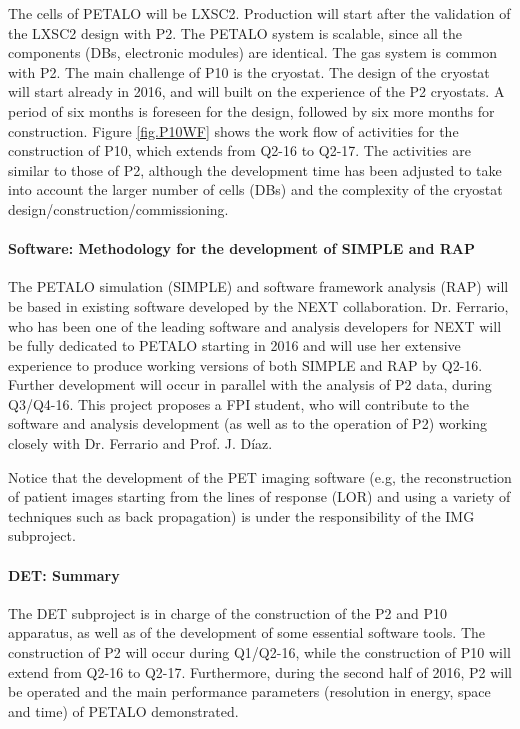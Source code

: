 The cells of PETALO will be LXSC2. Production will start after the validation of the LXSC2 design with P2. The PETALO system is scalable, since all the components (DBs, electronic modules) are identical. The gas system is common with P2. The main challenge of P10 is the cryostat. The design of the cryostat will start already in 2016, and will built on the experience of the P2 cryostats. A period of six months is foreseen for the design, followed by six more months for construction. Figure \ref{fig.P10WF} shows the work flow of activities for the construction of P10, which extends from Q2-16 to Q2-17. The activities are similar to those of P2, although the development time has been adjusted to take into account the larger number of cells (DBs) and the complexity of the cryostat design/construction/commissioning. 
 

\paragraph{Software: Methodology for the development of SIMPLE and RAP}
The PETALO simulation (SIMPLE) and software framework analysis (RAP) will be based in existing software developed by the NEXT collaboration. Dr. Ferrario, who has been one of the leading software and analysis developers for NEXT will be fully dedicated to PETALO starting in 2016 and will use her extensive experience to produce working versions of both SIMPLE and RAP by Q2-16. Further development will occur in parallel with the analysis of P2 data, during Q3/Q4-16. This project proposes a FPI student, who will contribute to the software and analysis development (as well as to the operation of P2) working closely with Dr. Ferrario and Prof. J. Díaz.

Notice that the development of the PET imaging software (e.g, the reconstruction of patient images starting from the lines of response (LOR) and using a variety of techniques such as back propagation) is under the responsibility of the IMG subproject. 

\paragraph{DET: Summary}
The DET subproject is in charge of the construction of the P2 and P10 apparatus, as well as of the development of some essential software tools. The construction of P2 will occur during Q1/Q2-16, while the construction of P10 will extend from Q2-16 to Q2-17. Furthermore, during the second half of 2016, P2 will be operated and the main performance parameters (resolution in energy, space and time) of PETALO demonstrated. 

